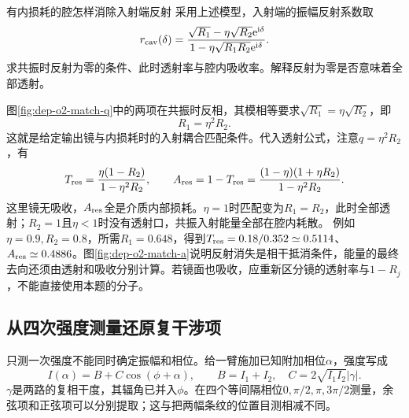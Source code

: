 \begin{example}有内损耗的腔怎样消除入射端反射
采用上述模型，入射端的振幅反射系数取
\[
 r_{\rm cav}(\delta)=\frac{\sqrt{R_1}-\eta\sqrt{R_2}\mathrm e^{\mathrm i\delta}}
 {1-\eta\sqrt{R_1R_2}\mathrm e^{\mathrm i\delta}}.
\]
求共振时反射为零的条件、此时透射率与腔内吸收率。解释反射为零是否意味着全部透射。
\end{example}
\begin{solution}
图\ref{fig:dep-o2-match-q}中的两项在共振时反相，其模相等要求$\sqrt{R_1}=\eta\sqrt{R_2}$，即
\[
 R_1=\eta^2R_2.
\]
这就是给定输出镜与内损耗时的入射耦合匹配条件。代入透射公式，注意$q=\eta^2R_2$，有
\[
 T_{\rm res}=\frac{\eta(1-R_2)}{1-\eta^2R_2},\qquad
 A_{\rm res}=1-T_{\rm res}
 =\frac{(1-\eta)(1+\eta R_2)}{1-\eta^2R_2}.
\]
这里镜无吸收，$A_{\rm res}$全是介质内部损耗。$\eta=1$时匹配变为$R_1=R_2$，此时全部透射；$R_2=1$且$\eta<1$时没有透射口，共振入射能量全部在腔内耗散。
例如$\eta=0.9,R_2=0.8$，所需$R_1=0.648$，得到$T_{\rm res}=0.18/0.352\simeq0.5114$、$A_{\rm res}\simeq0.4886$。图\ref{fig:dep-o2-match-a}说明反射消失是相干抵消条件，能量的最终去向还须由透射和吸收分别计算。若镜面也吸收，应重新区分镜的透射率与$1-R_j$，不能直接使用本题的分子。
\end{solution}

\subsection{从四次强度测量还原复干涉项}
只测一次强度不能同时确定振幅和相位。给一臂施加已知附加相位$\alpha$，强度写成
\[
 I(\alpha)=B+C\cos(\phi+\alpha),\qquad B=I_1+I_2,
 \quad C=2\sqrt{I_1I_2}|\gamma|.
\]
$\gamma$是两路的复相干度，其辐角已并入$\phi$。在四个等间隔相位$0,\pi/2,\pi,3\pi/2$测量，余弦项和正弦项可以分别提取；这与把两幅条纹的位置目测相减不同。

